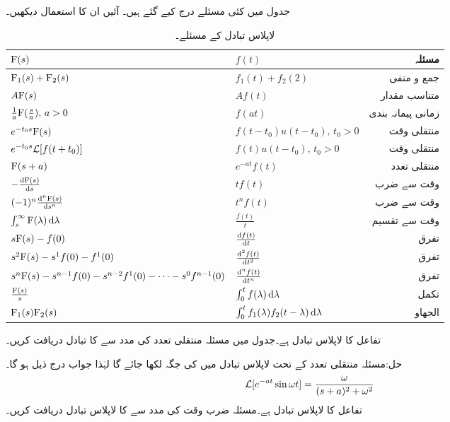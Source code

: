 جدول  میں کئی مسئلے درج کیے گئے ہیں۔ آئیں ان کا استعمال دیکھیں۔
\begin{table}
\caption{لاپلاس تبادل کے مسئلے۔}
\label{جدول_لاپلاس_مسئلے}
\centering
\begin{tabular}{l l r}
 ${{\textup{F}}}(s)$&$f(t)$ & مسئلہ\Bstrut \\
\hline
 ${{\textup{F}}}_1(s)+{{\textup{F}}}_2(s)$&$f_1(t)+f_2(2)$ & جمع و منفی\Tstrut \\
 $A{{\textup{F}}}(s)$&$Af(t)$& متناسب مقدار\\[2ex] 
$\frac{1}{a}{{\textup{F}}}(\frac{s}{a}),\, a>0$ & $ f(at)$ & زمانی پیمانہ بندی\\[2ex] 
 $e^{-t_0 s}{{\textup{F}}}(s)$&$f(t-t_0) u(t-t_0), \, t_0>0$  & منتقلی وقت\\[2ex] 
 $e^{-t_0 s}\mathcal{L} [f(t+t_0)]$&$f(t) u(t-t_0), \, t_0>0$  & منتقلی وقت\\[2ex] 
${{\textup{F}}}(s+a)$& $e^{-at} f(t)$  & منتقلی تعدد\\[2ex] 
$-\frac{\dif \bF(s)}{\dif s}$ & $t f(t)$  & وقت سے ضرب\\[2ex] 
$(-1)^n\frac{\dif{^n} \bF(s)}{\dif s^n}$ & $t^n f(t)$  & وقت سے ضرب\\[2ex] 
$\int_s^{\infty} \bF(\lambda) \dif \lambda $ & $\frac{f(t)}{t}$  & وقت سے تقسیم\\[2ex] 
$s {{\textup{F}}}(s)-f(0)$ & $\frac{\dif f(t)}{\dif t}$  & تفرق\\[2ex] 
$s^2 {{\textup{F}}}(s)-s^1 f(0)- f^1(0)$ & $\frac{\dif{^2} f(t)}{\dif t^2}$  & تفرق\\[2ex] 
$s^n {{\textup{F}}}(s)-s^{n-1}f(0)-s^{n-2} f^1(0)-\cdots -s^0 f^{n-1}(0)$ & $\frac{\dif{^n} f(t)}{\dif t^n}$  & تفرق\\[2ex] 
$\frac{{{\textup{F}}}(s)}{s}$ & $\int_0^t f(\lambda) \dif \lambda$  & تکمل\\[2ex] 
${{\textup{F}}}_1(s) {{\textup{F}}}_2(s)$ & $\int_0^t f_1(\lambda) f_2(t-\lambda) \dif \lambda$  & الجھاو
\end{tabular}
\end{table}
تفاعل  کا لاپلاس تبادل  ہے۔جدول  میں مسئلہ منتقلی تعدد کی مدد سے  کا تبادل دریافت کریں۔

حل:مسئلہ منتقلی تعدد کے تحت لاپلاس تبادل میں  کی جگہ   لکھا جائے گا لہٰذا جواب درج ذیل ہو گا۔
\begin{align*}
\mathcal{L}[e^{-at} \sin \omega t]=\frac{\omega}{(s+a)^2+\omega^2}
\end{align*}
تفاعل  کا لاپلاس تبادل  ہے۔مسئلہ ضرب وقت کی مدد سے  کا لاپلاس تبادل دریافت کریں۔

